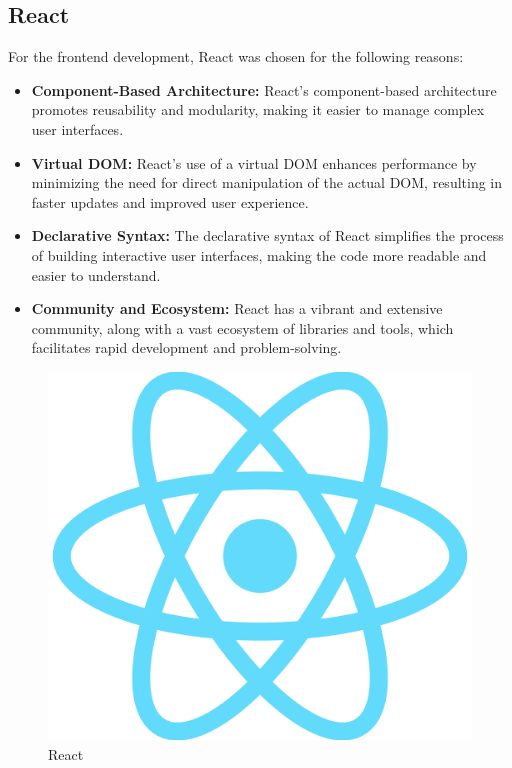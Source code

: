 \documentclass{Configuration_Files/Template}
\begin{document}
\subsection{React}
For the frontend development, React was chosen for the following reasons:

\begin{itemize}
    \item \textbf{Component-Based Architecture:} React's component-based architecture promotes reusability and modularity, making it easier to manage complex user interfaces.
    
    \item \textbf{Virtual DOM:} React's use of a virtual DOM enhances performance by minimizing the need for direct manipulation of the actual DOM, resulting in faster updates and improved user experience.
    
    \item \textbf{Declarative Syntax:} The declarative syntax of React simplifies the process of building interactive user interfaces, making the code more readable and easier to understand.
    
    \item \textbf{Community and Ecosystem:} React has a vibrant and extensive community, along with a vast ecosystem of libraries and tools, which facilitates rapid development and problem-solving.\\
\end{itemize}

\begin{figure}[h]
    \centering
    \includegraphics[scale = 0.02]{ITD_latex/Images/Frameworks/react.png}
    \caption{React}
\end{figure}
\end{document}
